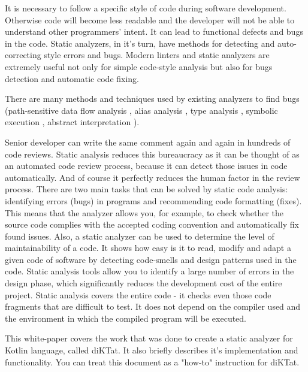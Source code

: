 It is necessary to follow a specific style of code during software development. Otherwise code will become less readable and the developer will not be able to  understand other programmers’ intent. It can lead to functional defects and bugs in the code. Static analyzers, in it's turn, have methods for detecting and auto-correcting style errors and bugs. Modern linters and static analyzers are extremely useful not only for simple code-style analysis but also for bugs detection and automatic code fixing.

There are many methods and techniques used by existing analyzers to ﬁnd bugs (path-sensitive data ﬂow analysis \cite{ref:kremenek}, alias analysis \cite{ref:effective}, type analysis \cite{ref:simple}, symbolic execution \cite{ref:dis}, abstract interpretation \cite{ref:dis}).

Senior developer can write the same comment again and again in hundreds of code reviews. Static analysis reduces this bureaucracy as it can be thought of as an automated code review process, because it can detect those issues in code automatically. And of course it perfectly reduces the human factor in the review process. There are two main tasks that can be solved by static code analysis: identifying errors (bugs) in programs and recommending code formatting (fixes). This means that the analyzer allows you, for example, to check whether the source code complies with the accepted coding convention and automatically fix found issues. Also, a static analyzer can be used to determine the level of maintainability of a code. It shows how easy is it to read, modify and adapt a given code of software by detecting code-smells and design patterns used in the code. Static analysis tools allow you to identify a large number of errors in the design phase, which significantly reduces the development cost of the entire project. Static analysis covers the entire code - it checks even those code fragments that are difficult to test. It does not depend on the compiler used and the environment in which the compiled program will be executed.

This white-paper covers the work that was done to create a static analyzer for Kotlin language, called diKTat. It also briefly describes it's implementation and functionality. You can treat this document as a "how-to" instruction for diKTat.